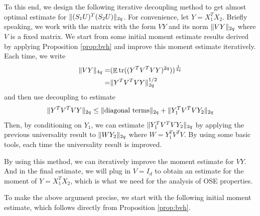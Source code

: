 \documentclass[11pt]{amsart}
\numberwithin{equation}{section}
\numberwithin{equation}{section}
\DeclareMathOperator{\E}{\mathbb{E}}
\DeclareMathOperator*{\tr}{tr}
\DeclarePairedDelimiter{\norm}{\lVert}{\rVert}
\begin{document}
To this end, we design the following iterative decoupling method to get almost optimal estimate for $\norm{(S_1 U)^T(S_2 U)}_{2q}$. For convenience, let $Y=X_1^TX_2$. Briefly speaking, we work with the matrix with the form $VY$ and its norm $\norm{VY}_{2q}$ where $V$ is a fixed matrix. We start from some initial moment estimate results derived by applying Proposition \ref{prop:bvh} and improve this moment estimate iteratively. Each time, we write 
\begin{align*}
    \norm{VY}_{4q}=&(\E\tr((Y^TV^TVY)^{2q}))^{\frac{1}{4q}}
\\=&\norm{Y^TV^TVY}_{2q}^{1/2}
\end{align*}
and then use decoupling to estimate
\begin{align*}
    \norm{Y^TV^TVY}_{2q} \le \norm{\text{diagonal terms}}_{2q}+\norm{Y_1^TV^TVY_2}_{2q}
\end{align*}
Then, by conditioning on $Y_1$, we can estimate $\norm{Y_1^TV^TVY_2}_{2q}$ by applying the previous universality result to $\norm{WY_2}_{2q}$ where $W=Y_1^TV^TV$. By using some basic tools, each time the universality result is improved.

By using this method, we can iteratively improve the moment estimate for $VY$. And in the final estimate, we will plug in $V=I_d$ to obtain an estimate for the moment of $Y=X_1^TX_2$, which is what we need for the analysis of OSE properties.

To make the above argument precise, we start with the following initial moment estimate, which follows directly from Proposition \ref{prop:bvh}.
\end{document}
